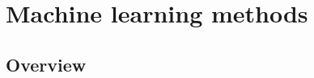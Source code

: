 \documentclass[11pt, oneside]{article}   	%
\begin{document}
%
%
%
%
%
%
%

\section{Machine learning methods}
\subsection{Overview}
\end{document}
